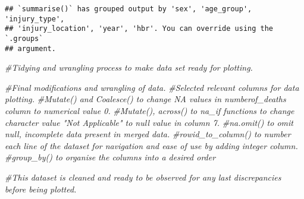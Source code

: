 \documentclass[
]{article}
\newenvironment{Shaded}{\begin{snugshade}}{\end{snugshade}}
\newcommand{\CommentTok}[1]{\textcolor[rgb]{0.56,0.35,0.01}{\textit{#1}}}
\begin{document}
\begin{verbatim}
## `summarise()` has grouped output by 'sex', 'age_group', 'injury_type',
## 'injury_location', 'year', 'hbr'. You can override using the `.groups`
## argument.
\end{verbatim}

\begin{Shaded}
\begin{Highlighting}[]
\CommentTok{\#Tidying and wrangling process to make data set ready for plotting.}

\CommentTok{\#Final modifications and wrangling of data.}
\CommentTok{\#Selected relevant columns for data plotting.}
\CommentTok{\#Mutate() and Coalesce() to change NA values in numberof\_deaths column to numerical value 0.}
\CommentTok{\#Mutate(), across() to na\_if functions to change character value "Not Applicable" to null value in column 7.}
\CommentTok{\#na.omit() to omit null, incomplete data present in merged data.}
\CommentTok{\#rowid\_to\_column() to number each line of the dataset for navigation and ease of use by adding integer column.}
\CommentTok{\#group\_by() to organise the columns into a desired order}

\CommentTok{\#This dataset is cleaned and ready to be observed for any last discrepancies before being plotted. }
\end{Highlighting}
\end{Shaded}
\end{document}

